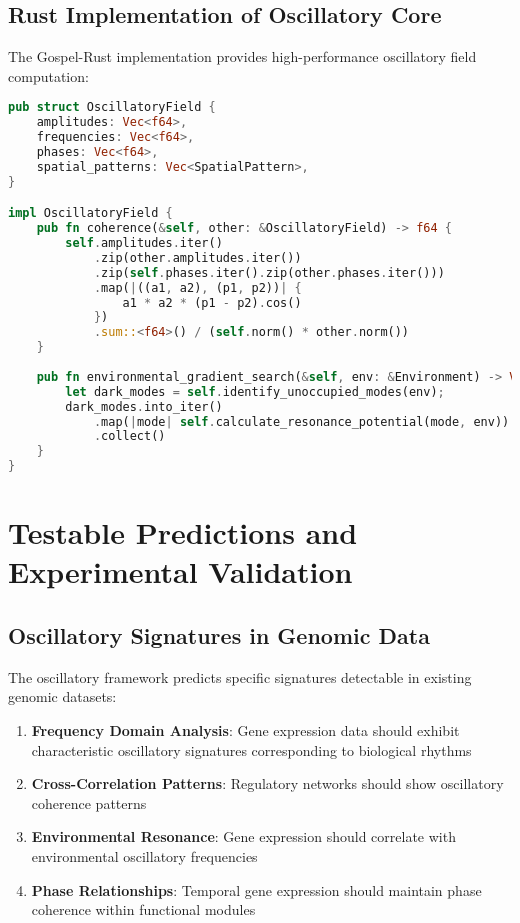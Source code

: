 \documentclass[12pt,a4paper]{article}
\begin{document}
\subsection{Rust Implementation of Oscillatory Core}

The Gospel-Rust implementation provides high-performance oscillatory field computation:

\begin{lstlisting}[language=Rust]
pub struct OscillatoryField {
    amplitudes: Vec<f64>,
    frequencies: Vec<f64>, 
    phases: Vec<f64>,
    spatial_patterns: Vec<SpatialPattern>,
}

impl OscillatoryField {
    pub fn coherence(&self, other: &OscillatoryField) -> f64 {
        self.amplitudes.iter()
            .zip(other.amplitudes.iter())
            .zip(self.phases.iter().zip(other.phases.iter()))
            .map(|((a1, a2), (p1, p2))| {
                a1 * a2 * (p1 - p2).cos()
            })
            .sum::<f64>() / (self.norm() * other.norm())
    }
    
    pub fn environmental_gradient_search(&self, env: &Environment) -> Vec<Gradient> {
        let dark_modes = self.identify_unoccupied_modes(env);
        dark_modes.into_iter()
            .map(|mode| self.calculate_resonance_potential(mode, env))
            .collect()
    }
}
\end{lstlisting}

\section{Testable Predictions and Experimental Validation}

\subsection{Oscillatory Signatures in Genomic Data}

The oscillatory framework predicts specific signatures detectable in existing genomic datasets:

\begin{enumerate}
\item \textbf{Frequency Domain Analysis}: Gene expression data should exhibit characteristic oscillatory signatures corresponding to biological rhythms
\item \textbf{Cross-Correlation Patterns}: Regulatory networks should show oscillatory coherence patterns
\item \textbf{Environmental Resonance}: Gene expression should correlate with environmental oscillatory frequencies
\item \textbf{Phase Relationships}: Temporal gene expression should maintain phase coherence within functional modules
\end{enumerate}
\end{document}
